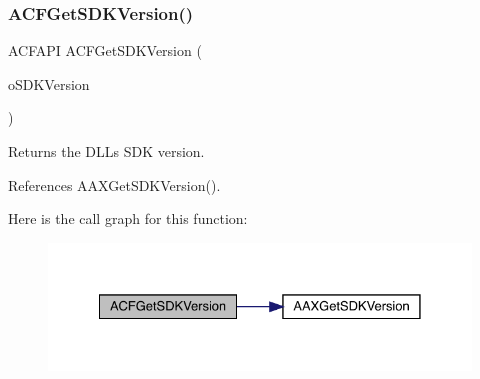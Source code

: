 \subsubsection{\texorpdfstring{ACFGetSDKVersion()}{ACFGetSDKVersion()}}
{\footnotesize\ttfamily A\+C\+F\+A\+PI A\+C\+F\+Get\+S\+D\+K\+Version (\begin{DoxyParamCaption}\item[{acf\+U\+Int64 $\ast$}]{o\+S\+D\+K\+Version }\end{DoxyParamCaption})}



Returns the D\+LL\textquotesingle{}s S\+DK version. 



References A\+A\+X\+Get\+S\+D\+K\+Version().

Here is the call graph for this function\+:
\nopagebreak
\begin{figure}[H]
\begin{center}
\leavevmode
\includegraphics[width=328pt]{a00500_a2a47c5f7e29baf716a4c4956389e83c9_cgraph}
\end{center}
\end{figure}
